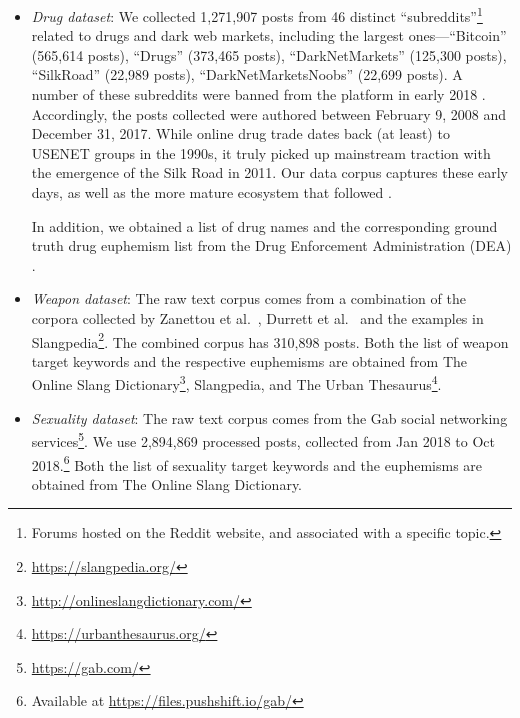 \begin{itemize}%
	\item {\em Drug dataset}: We collected 1,271,907 posts from 46 distinct 
	``subreddits''\footnote{Forums hosted on the Reddit website, 
	and associated with a specific topic.} 
	related to drugs and dark web markets, 
	including the largest ones---``Bitcoin'' (565,614 posts), 
``Drugs'' (373,465 posts),
``DarkNetMarkets'' (125,300 posts),
``SilkRoad'' (22,989 posts), 
``DarkNetMarketsNoobs'' (22,699 posts). 
A number of these subreddits were banned from the platform 
in early 2018 \cite{cimpanu2018reddit}. 
Accordingly, the posts collected were authored between February 9, 2008 and December 31, 2017. 
While online drug trade dates back (at least) to USENET groups in the 1990s, 
it truly picked up mainstream traction with the emergence of the 
Silk Road in 2011. 
Our data corpus captures these early days, 
as well as the more mature ecosystem that followed 
\cite{soska15markets}.

	In addition, we obtained a list of drug names and the corresponding ground truth drug euphemism list from the Drug Enforcement Administration (DEA) \cite{drug2018slang}. 
	
	\item {\em Weapon dataset}: The raw text corpus comes from a combination of the 
	corpora collected by Zanettou et al.\ \cite{zannettou2018gab}, Durrett et al.\ \cite{durrett2017identifying} and the examples in Slangpedia\footnote{\url{https://slangpedia.org/}}. 
	The combined corpus has 310,898 posts. 
	Both the list of weapon target keywords and the respective euphemisms are obtained from The Online Slang Dictionary\footnote{\url{http://onlineslangdictionary.com/}}, Slangpedia, and The Urban Thesaurus\footnote{\url{https://urbanthesaurus.org/}}. 
	
	\item {\em Sexuality dataset}: The raw text corpus comes from the Gab social networking services\footnote{\url{https://gab.com/}}. We use 2,894,869 processed posts, collected from Jan 2018 to Oct 2018.\footnote{Available at \url{https://files.pushshift.io/gab/}}
	Both the list of sexuality target keywords and the euphemisms are obtained from The Online Slang Dictionary. 
\end{itemize}


